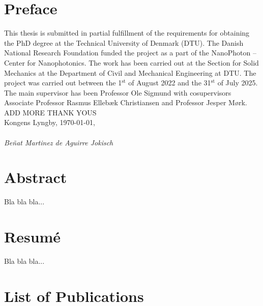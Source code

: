 \chapter*{Preface}

This thesis is submitted in partial fulfillment of the requirements for obtaining
the PhD degree at the Technical University of Denmark
(DTU). The Danish National Research Foundation funded the project as a part of
the NanoPhoton -- Center for Nanophotonics. The work has been carried out at the
Section for Solid Mechanics at the Department of Civil and Mechanical Engineering
at DTU. The project was carried out between the 1$^\text{st}$ of August 2022 and the 31$^\text{st}$
of July 2025. The main supervisor has been Professor Ole Sigmund with cosupervisors Associate Professor Rasmus Ellebæk Christiansen and Professor Jesper
Mørk.\\

ADD MORE THANK YOUS\\

\noindent Kongens Lyngby, \today,\\
\vspace{0.1cm}\\
\noindent \textit{Beñat Martinez de Aguirre Jokisch}

\chapter*{Abstract}

Bla bla bla...

\chapter*{Resumé}

Bla bla bla...

\cleardoublepage
\chapter*{List of Publications}
\nocite{ownpub0,ownpub1,ownpub2}
\newrefcontext[sorting=none,labelprefix=P]
\printbibliography[env=bibliographyNUM,keyword=myPub,title={List of publications},heading=none,resetnumbers]
\newrefcontext[sorting=none,labelprefix=M]
\printbibliography[env=bibliographyNUM,keyword=myMan,heading=none,resetnumbers]

\cleardoublepage

{
  \hypersetup{linkcolor=black}
  \tableofcontents*
}

